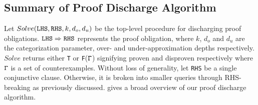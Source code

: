 \subsection{Summary of Proof Discharge Algorithm}
\vspace{-3px}
\label{sec:syn-algosummary}
Let $Solve({\tt LHS}, {\tt RHS}, k, d_o, d_u)$ be the top-level procedure for discharging proof obligations.
${\tt LHS}\Rightarrow{\tt RHS}$ represents the proof obligation, where $k$, $d_o$ and $d_u$ are the categorization parameter,
over- and under-approximation depths respectively.
$Solve$ returns either {\tt T} or {\tt F}(${\tt \Gamma}$) signifying proven and disproven respectively
where ${\tt \Gamma}$ is a set of counterexamples.
Without loss of generality, let {\tt RHS} be a single conjunctive
clause. Otherwise, it is broken into smaller queries through RHS-breaking as previously discussed. 
gives a broad overview of our proof discharge algorithm.








